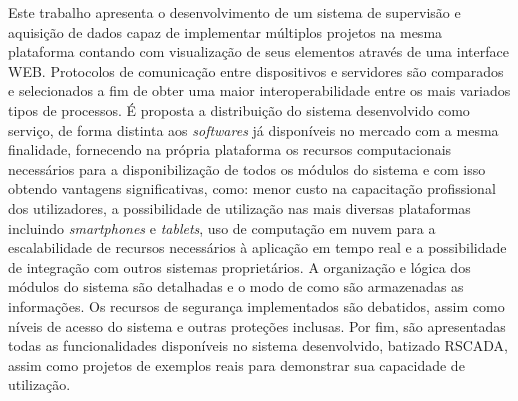 Este trabalho apresenta o desenvolvimento de um sistema de supervisão e aquisição de dados capaz de implementar múltiplos projetos na mesma plataforma contando com visualização de seus elementos através de uma interface WEB. Protocolos de comunicação entre dispositivos e servidores são comparados e selecionados a fim de obter uma maior interoperabilidade entre os mais variados tipos de processos. É proposta a distribuição do sistema desenvolvido como serviço, de forma distinta aos \textit{softwares} já disponíveis no mercado com a mesma finalidade, fornecendo na própria plataforma os recursos computacionais necessários para a disponibilização de todos os módulos do sistema e com isso obtendo vantagens significativas, como: menor custo na capacitação profissional dos utilizadores, a possibilidade de utilização nas mais diversas plataformas incluindo \textit{smartphones} e \textit{tablets}, uso de computação em nuvem para a escalabilidade de recursos necessários à aplicação em tempo real e a possibilidade de integração com outros sistemas proprietários. A organização e lógica dos módulos do sistema são detalhadas e o modo de como são armazenadas as informações. Os recursos de segurança implementados são debatidos, assim como níveis de acesso do sistema e outras proteções inclusas. Por fim, são apresentadas todas as funcionalidades disponíveis no sistema desenvolvido, batizado RSCADA, assim como projetos de exemplos reais para demonstrar sua capacidade de utilização.

